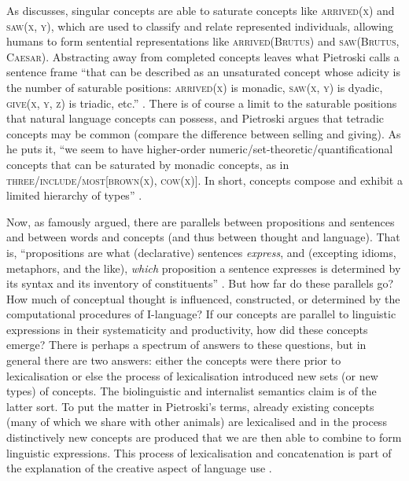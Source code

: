As \citet[249]{Pietroski2010} discusses, singular concepts are able to saturate concepts like \textsc{arrived(x)} and \textsc{saw(x, y)}, which are used to classify and relate represented individuals, allowing humans to form sentential representations like \textsc{arrived(Brutus)} and \textsc{saw(Brutus, Caesar)}. Abstracting away from completed concepts leaves what Pietroski calls a sentence frame “that can be described as an unsaturated concept whose adicity is the number of saturable positions: \textsc{arrived(x)} is monadic, \textsc{saw(x, y)} is dyadic, \textsc{give(x, y, z)} is triadic, etc.” \citep[249]{Pietroski2010}. There is of course a limit to the saturable positions that natural language concepts can possess, and Pietroski argues that tetradic concepts may be common (compare the difference between selling and giving). As he puts it, “we seem to have higher-order numeric/set-theoretic/quantificational concepts that can be saturated by monadic concepts, as in \textsc{three/include/most[brown(x), cow(x)]}. In short, concepts compose and exhibit a limited hierarchy of types” \citep[249]{Pietroski2010}.

Now, as \citet{Fodor1975} famously argued, there are parallels between propositions and sentences and between words and concepts (and thus between thought and language). That is, “propositions are what (declarative) sentences \textit{express}, and (excepting idioms, metaphors, and the like), \textit{which} proposition a sentence expresses is determined by its syntax and its inventory of constituents” \citep[8, emphasis in original]{FodorPylyshyn2015}. But how far do these parallels go? How much of conceptual thought is influenced, constructed, or determined by the computational procedures of I-language? If our concepts are parallel to linguistic expressions in their systematicity and productivity, how did these concepts emerge? There is perhaps a spectrum of answers to these questions, but in general there are two answers: either the concepts were there prior to lexicalisation or else the process of lexicalisation introduced new sets (or new types) of concepts. The biolinguistic and internalist semantics claim is of the latter sort. To put the matter in Pietroski’s terms, already existing concepts (many of which we share with other animals) are lexicalised and in the process distinctively new concepts are produced that we are then able to combine to form linguistic expressions. This process of lexicalisation and concatenation is part of the  explanation of the creative aspect of language use \citep{Chomsky1966,McGilvray2001,McGilvray2005,Asoulin2013}.
	
